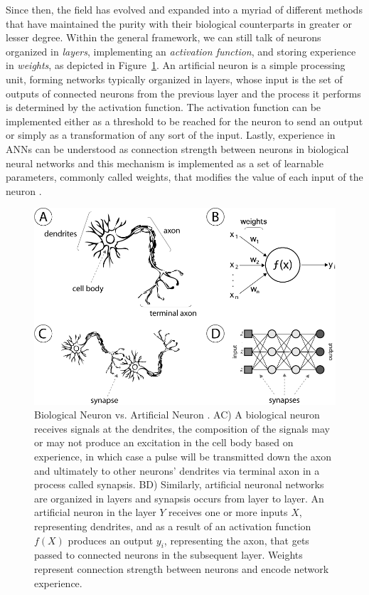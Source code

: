 Since then, the field has evolved and expanded into a myriad of different methods that have maintained the purity with their biological counterparts in greater or lesser degree.
Within the general framework, we can still talk of neurons organized in \emph{layers}, implementing an \emph{activation function}, and storing experience in \emph{weights}, as depicted in Figure~\ref{fig:sec:theory:neurons}.
An artificial neuron is a simple processing unit, forming networks typically organized in layers, whose input is the set of outputs of connected neurons from the previous layer and the process it performs is determined by the activation function.
The activation function can be implemented either as a threshold to be reached for the neuron to send an output or simply as a transformation of any sort of the input.
Lastly, experience in ANNs can be understood as connection strength between neurons in biological neural networks and this mechanism is implemented as a set of learnable parameters, commonly called weights, that modifies the value of each input of the neuron \cite{Hinton1990}.

\begin{figure}[htb]
  \includegraphics[width=\textwidth]{gfx/neurons}
  \caption{
    Biological Neuron vs. Artificial Neuron \cite{Honorio2013}.
    AC) A biological neuron receives signals at the dendrites, the composition of the signals may or may not produce an excitation in the cell body based on experience, in which case a pulse will be transmitted down the axon and ultimately to other neurons' dendrites via terminal axon in a process called synapsis.
    BD) Similarly, artificial neuronal networks are organized in layers and synapsis occurs from layer to layer.
    An artificial neuron in the layer $Y$ receives one or more inputs $X$, representing dendrites, and as a result of an activation function $f(X)$ produces an output $y_i$, representing the axon, that gets passed to connected neurons in the subsequent layer.
    Weights represent connection strength between neurons and encode network experience.
  }
  \label{fig:sec:theory:neurons}
\end{figure}


